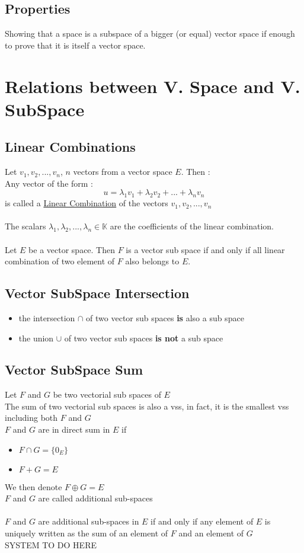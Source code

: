 \documentclass[notitlepage]{math}
\begin{document}
\subsection{Properties}
Showing that a space is a subspace of a bigger (or equal) vector space if enough to prove that it is itself a vector space.
\section{Relations between V. Space and V. SubSpace}
\subsection{Linear Combinations}
Let $v_1,v_2,...,v_n$, $n$ vectors from a vector space $E$. Then :\\
Any vector of the form :
\[u = \lambda_1 v_1 + \lambda_2 v_2 + ... + \lambda_n v_n\]
is called a \underline{Linear Combination} of the vectors $v_1, v_2, ..., v_n$\\ \\
The scalars $\lambda_1, \lambda_2, ..., \lambda_n \in \mathbb{K}$ are the coefficients of the linear combination.\\\\
Let $E$ be a vector space. Then $F$ is a vector sub space if and only if all linear combination of two element of $F$ also belongs to $E$.

\subsection{Vector SubSpace Intersection}
\begin{itemize}
    \item the intersection $\cap$ of two vector sub spaces \textbf{is} also a sub space
    \item the union $\cup$ of two vector sub spaces \textbf{is not} a sub space
\end{itemize}
\subsection{Vector SubSpace Sum}
Let $F$ and $G$ be two vectorial sub spaces of $E$\\
The sum of two vectorial sub spaces is also a vss, in fact, it is the smallest vss including both  $F$ and $G$ \\
$F$ and $G$ are in direct sum in $E$ if
\begin{itemize}
    \item $F \cap G = \{0_E\}$
    \item $F + G = E$
\end{itemize}
We then denote $F \oplus G = E$\\
$F$  and $G$ are called additional sub-spaces\\\\
$F$ and $G$ are additional sub-spaces in $E$ if and only if any element of $E$ is uniquely written as the sum of an element of $F$ and an element of $G$\\
SYSTEM TO DO HERE
\end{document}
